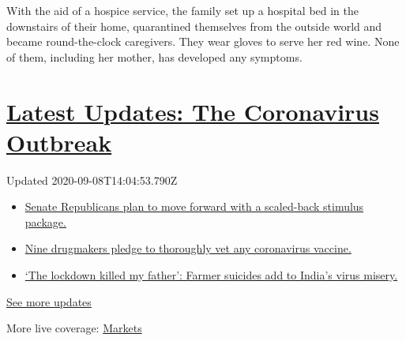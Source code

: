 With the aid of a hospice service, the family set up a hospital bed in
the downstairs of their home, quarantined themselves from the outside
world and became round-the-clock caregivers. They wear gloves to serve
her red wine. None of them, including her mother, has developed any
symptoms.

\hypertarget{latest-updates-the-coronavirus-outbreak}{%
\section{\texorpdfstring{\href{https://www.nytimes3xbfgragh.onion/2020/09/08/world/covid-19-coronavirus.html?action=click\&pgtype=Article\&state=default\&region=MAIN_CONTENT_1\&context=storylines_live_updates}{Latest
Updates: The Coronavirus
Outbreak}}{Latest Updates: The Coronavirus Outbreak}}\label{latest-updates-the-coronavirus-outbreak}}

Updated 2020-09-08T14:04:53.790Z

\begin{itemize}
\tightlist
\item
  \href{https://www.nytimes3xbfgragh.onion/2020/09/08/world/covid-19-coronavirus.html?action=click\&pgtype=Article\&state=default\&region=MAIN_CONTENT_1\&context=storylines_live_updates\#link-547feae1}{Senate
  Republicans plan to move forward with a scaled-back stimulus package.}
\item
  \href{https://www.nytimes3xbfgragh.onion/2020/09/08/world/covid-19-coronavirus.html?action=click\&pgtype=Article\&state=default\&region=MAIN_CONTENT_1\&context=storylines_live_updates\#link-679303d7}{Nine
  drugmakers pledge to thoroughly vet any coronavirus vaccine.}
\item
  \href{https://www.nytimes3xbfgragh.onion/2020/09/08/world/covid-19-coronavirus.html?action=click\&pgtype=Article\&state=default\&region=MAIN_CONTENT_1\&context=storylines_live_updates\#link-1c973131}{`The
  lockdown killed my father': Farmer suicides add to India's virus
  misery.}
\end{itemize}

\href{https://www.nytimes3xbfgragh.onion/2020/09/08/world/covid-19-coronavirus.html?action=click\&pgtype=Article\&state=default\&region=MAIN_CONTENT_1\&context=storylines_live_updates}{See
more updates}

More live coverage:
\href{https://www.nytimes3xbfgragh.onion/live/2020/09/08/business/stock-market-today-coronavirus?action=click\&pgtype=Article\&state=default\&region=MAIN_CONTENT_1\&context=storylines_live_updates}{Markets}

